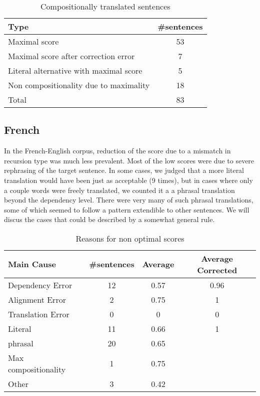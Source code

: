 \begin{table}[!ht]
\centering
\begin{tabular}{|l|c|}
\hline
\textbf{Type} & \textbf{\#sentences}\\
\hline
\hline
Maximal score & 53 \\
\hline
Maximal score after correction error & 7\\
\hline
Literal alternative with maximal score & 5\\
\hline
Non compositionality due to maximality & 18\\
\hline
Total & 83\\
\hline
\end{tabular}
\caption{Compositionally translated sentences}\label{tab:optimal_score}
\end{table}

\subsection{French}

In the French-English corpus, reduction of the score due to a mismatch in recursion type was much less prevalent. Most of the low scores were due to severe rephrasing of the target sentence. In some cases, we judged that a more literal translation would have been just as acceptable (9 times), but in cases where only a couple words were freely translated, we counted it a a phrasal translation beyond the dependency level. There were very many of such phrasal translations, some of which seemed to follow a pattern extendible to other sentences. We will discus the cases that could be described by a somewhat general rule.

\begin{table}[!ht]
\centering
\begin{tabular}{|l|c|c|c|}
\hline
\textbf{Main Cause} & \textbf{\#sentences} & \textbf{Average} & \textbf{Average Corrected}\\
\hline \hline
Dependency Error & 12 & 0.57 & 0.96\\
\hline
Alignment Error & 2 & 0.75 & 1\\
\hline
Translation Error & 0 & 0 & 0 \\
\hline
Literal & 11 & 0.66  & 1\\
\hline
phrasal& 20 & 0.65 \\
\cline{1-3}
Max compositionality & 1 & 0.75\\
\cline{1-3}
Other & 3 & 0.42\\
\cline{1-3}
\end{tabular}
\caption{Reasons for non optimal scores}\label{tab:non_optimal2}
\end{table}

